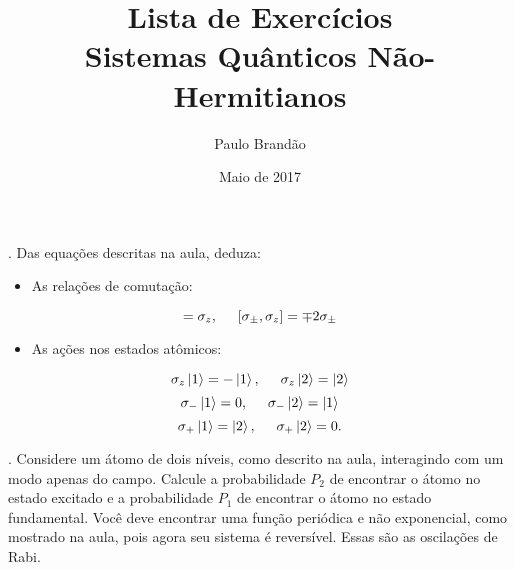 \documentclass{article}
\title{\color{astral}\textbf{Lista de Exercícios} \\ \textbf{Sistemas Quânticos Não-Hermitianos}}
\author{Paulo Brandão}
\date{Maio de 2017}
\begin{document}
\maketitle


. Das equações descritas na aula, deduza:

\begin{itemize}
    \item As relações de comutação:
\end{itemize} 
\begin{equation}
    [\sigma_+ , \sigma_-] = \sigma_z, \hspace{0.5cm} [\sigma_{\pm},\sigma_z] = \mp 2 \sigma_{\pm}
\end{equation}

\begin{itemize}
    \item As ações nos estados atômicos:
\end{itemize} 
\begin{equation}
    \sigma_z \ket{1} = -\ket{1}, \hspace{0.5cm} \sigma_z \ket{2} = \ket{2}
\end{equation}
\begin{equation}
    \sigma_- \ket{1} = 0, \hspace{0.5cm} \sigma_- \ket{2} = \ket{1}
\end{equation}
\begin{equation}
    \sigma_+ \ket{1} = \ket{2}, \hspace{0.5cm} \sigma_+ \ket{2} = 0.
\end{equation}



\vspace{1cm}


. Considere um átomo de dois níveis, como descrito na aula, interagindo com um modo apenas do campo. Calcule a probabilidade $P_2$ de encontrar o átomo no estado excitado e a probabilidade $P_1$ de encontrar o átomo no estado fundamental. Você deve encontrar uma função periódica e não exponencial, como mostrado na aula, pois agora seu sistema é reversível. Essas são as oscilações de Rabi. 
\end{document}
